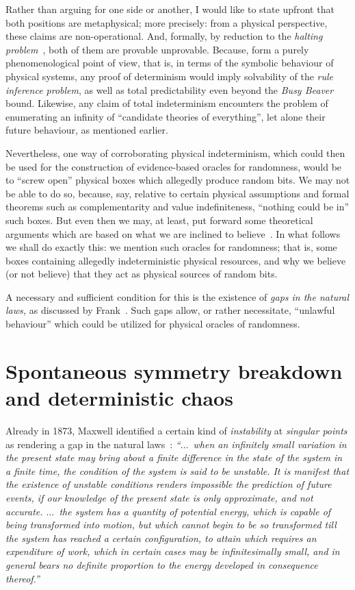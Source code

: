 \documentclass{llncs}
\begin{document}
Rather than arguing for one side or another, I would like to state upfront that both positions are metaphysical;
more precisely: from a physical perspective, these claims are non-operational.
And, formally, by reduction to the {\em halting problem}~\cite[Sec.~642]{Gruska-foc},
both of them are provable unprovable.
Because, form a purely phenomenological point of view, that is, in terms of the symbolic behaviour of physical systems,
any proof of determinism would imply solvability of the {\em rule inference problem},
as well as total predictability
even beyond the {\em Busy Beaver} bound.
Likewise, any claim of total indeterminism encounters the problem of enumerating an infinity of ``candidate theories of everything'',
let alone their future behaviour, as mentioned earlier.

Nevertheless, one way of corroborating physical indeterminism,
which could then be used for the construction of evidence-based oracles for randomness,
would be to ``screw open'' physical boxes which allegedly produce random bits.
We may not be able to do so, because, say,
relative to certain physical assumptions and formal theorems such as complementarity and value indefiniteness,
``nothing could be in'' such boxes.
But even then we may, at least, put forward
some theoretical arguments which are based on what we are inclined to believe~\cite[866]{born-26-1}.
In what follows we shall do exactly this:
we mention such oracles for randomness; that is, some boxes containing allegedly
indeterministic physical resources,
and why we believe (or not believe) that they act as physical sources of random bits.


A necessary and sufficient condition for this is the
existence of {\em gaps in the natural laws,} as discussed by Frank~\cite[Chapter~{III}, Sec.~12]{franke}.
Such gaps allow, or rather necessitate, ``unlawful behaviour'' which could be utilized for physical oracles of randomness.


\section{Spontaneous symmetry breakdown and deterministic chaos}

Already in 1873, Maxwell identified a certain kind of {\em instability} at {\em singular points}
as rendering a gap in the natural laws~\cite[211-212]{Campbell-1882}:
{\em ``$\ldots$~when an infinitely small variation in the present state may bring about a finite difference in the state of the
system in a finite time, the condition of the system is said to be unstable.
It is manifest that the existence of unstable conditions renders impossible the prediction of future events, if our
knowledge of the present state is only approximate, and not accurate.
$\ldots$~the system has a quantity of potential energy, which is
capable of being transformed into motion, but which cannot begin to be so transformed till the system has reached
a certain configuration, to attain which requires an expenditure of work, which in certain cases may be
infinitesimally small, and in general bears no definite proportion to the energy developed in consequence thereof.''}
\end{document}
